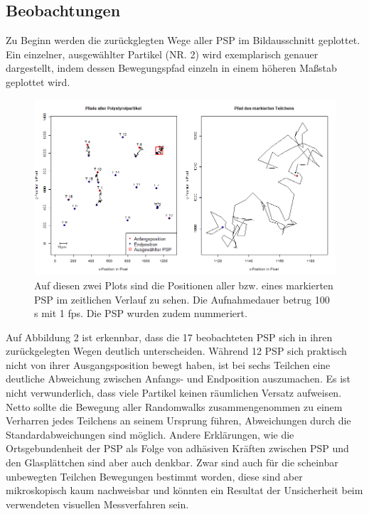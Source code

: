 \documentclass[
  9pt,
]{article}
\begin{document}
\hypertarget{beobachtungen}{%
\subsection{Beobachtungen}\label{beobachtungen}}

Zu Beginn werden die zurückglegten Wege aller PSP im Bildausschnitt
geplottet. Ein einzelner, ausgewählter Partikel (NR. 2) wird
exemplarisch genauer dargestellt, indem dessen Bewegungspfad einzeln in
einem höheren Maßstab geplottet wird.

\begin{figure}
\centering
\includegraphics[width=\textwidth,height=0.2\textheight]{code/Plots/Raum.png}
\caption{Auf diesen zwei Plots sind die Positionen aller bzw. eines
markierten PSP im zeitlichen Verlauf zu sehen. Die Aufnahmedauer betrug
100 s mit 1 fps. Die PSP wurden zudem nummeriert.}
\end{figure}

Auf Abbildung 2 ist erkennbar, dass die 17 beobachteten PSP sich in
ihren zurückgelegten Wegen deutlich unterscheiden. Während 12 PSP sich
praktisch nicht von ihrer Ausgangsposition bewegt haben, ist bei sechs
Teilchen eine deutliche Abweichung zwischen Anfangs- und Endposition
auszumachen. Es ist nicht verwunderlich, dass viele Partikel keinen
räumlichen Versatz aufweisen. Netto sollte die Bewegung aller
Randomwalks zusammengenommen zu einem Verharren jedes Teilchens an
seinem Ursprung führen, Abweichungen durch die Standardabweichungen sind
möglich. Andere Erklärungen, wie die Ortsgebundenheit der PSP als Folge
von adhäsiven Kräften zwischen PSP und den Glasplättchen sind aber auch
denkbar. Zwar sind auch für die scheinbar unbewegten Teilchen Bewegungen
bestimmt worden, diese sind aber mikroskopisch kaum nachweisbar und
könnten ein Resultat der Unsicherheit beim verwendeten visuellen
Messverfahren sein.
\end{document}
